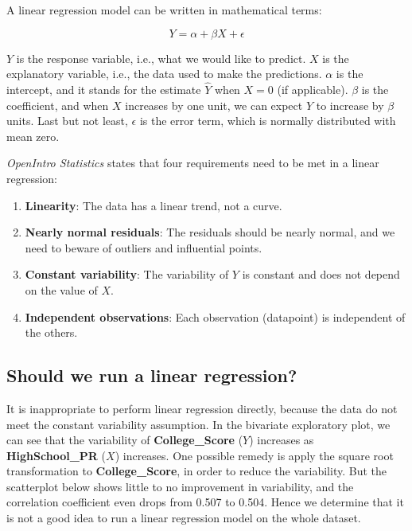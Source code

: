 \documentclass[
]{article}
\begin{document}
A linear regression model can be written in mathematical terms:

\[Y = \alpha + \beta X + \epsilon\]

\(Y\) is the response variable, i.e., what we would like to predict.
\(X\) is the explanatory variable, i.e., the data used to make the
predictions. \(\alpha\) is the intercept, and it stands for the estimate
\(\hat{Y}\) when \(X = 0\) (if applicable). \(\beta\) is the
coefficient, and when \(X\) increases by one unit, we can expect \(Y\)
to increase by \(\beta\) units. Last but not least, \(\epsilon\) is the
error term, which is normally distributed with mean zero.

\emph{OpenIntro Statistics} \citep{diez2019openintro} states that four
requirements need to be met in a linear regression:

\begin{enumerate}
\item \textbf{Linearity}: The data has a linear trend, not a curve.
\item \textbf{Nearly normal residuals}: The residuals should be nearly normal, and we need to beware of outliers and influential points.
\item \textbf{Constant variability}: The variability of $Y$ is constant and does not depend on the value of $X$.
\item \textbf{Independent observations}: Each observation (datapoint) is independent of the others.
\end{enumerate}

\hypertarget{should-we-run-a-linear-regression}{%
\subsection{Should we run a linear
regression?}\label{should-we-run-a-linear-regression}}

It is inappropriate to perform linear regression directly, because the
data do not meet the constant variability assumption. In the bivariate
exploratory plot, we can see that the variability of
\textbf{College\_Score} (\(Y\)) increases as \textbf{HighSchool\_PR}
(\(X\)) increases. One possible remedy is apply the square root
transformation to \textbf{College\_Score}, in order to reduce the
variability. But the scatterplot below shows little to no improvement in
variability, and the correlation coefficient even drops from 0.507 to
0.504. Hence we determine that it is not a good idea to run a linear
regression model on the whole dataset.
\end{document}
